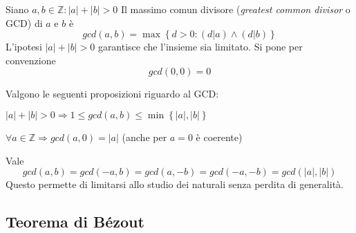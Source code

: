 \begin{definition} 
    \label{def:gcd}
    Siano $a, b \in \mathbb{Z} : |a| + |b| > 0$
    Il massimo comun divisore (\emph{greatest common divisor} o GCD) di $a$ e $b$ è
    \begin{equation*}
        gcd(a, b) = \max \left\{ 
            d > 0 :
            \left( 
                d|a
            \right)
            \wedge
            \left( 
                d|b
            \right)
        \right\}
    \end{equation*}
    L'ipotesi $|a| + |b| > 0$ garantisce che l'insieme sia limitato.
    Si pone per convenzione
    \begin{equation*}
        gcd(0,0) = 0
    \end{equation*}
\end{definition}
Valgono le seguenti proposizioni riguardo al GCD:
\begin{proposizione}
    \label{prop:gcd_bound}
    $ 
    |a| + |b| > 0
    \Rightarrow 
    1 \leq gcd(a,b)
    \leq \min \left\{ |a|, |b| \right\}
    $
\end{proposizione}
\begin{proposizione}
    \label{prop:gcd_zero}
    $ 
    \forall a \in \mathbb{Z}
    \Rightarrow 
    gcd(a,0) = |a|
    $ (anche per $a=0$ è coerente)
\end{proposizione}
\begin{proposizione}
    Vale
    \begin{equation*}
        gcd(a,b) =
        gcd(-a,b) =
        gcd(a,-b) =
        gcd(-a,-b) =
        gcd(|a|,|b|)
    \end{equation*}
    Questo permette di limitarsi allo studio dei naturali senza perdita di generalità.
\end{proposizione}

\subsection{Teorema di Bézout}

